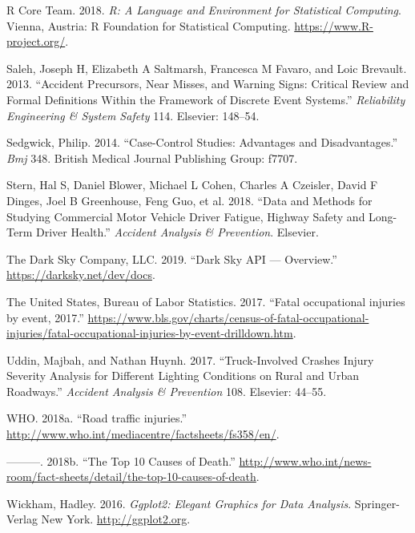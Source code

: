 \documentclass[]{elsarticle} %
\begin{document}
\leavevmode\hypertarget{ref-Rcitation}{}%
R Core Team. 2018. \emph{R: A Language and Environment for Statistical Computing}. Vienna, Austria: R Foundation for Statistical Computing. \url{https://www.R-project.org/}.

\leavevmode\hypertarget{ref-saleh2013accident}{}%
Saleh, Joseph H, Elizabeth A Saltmarsh, Francesca M Favaro, and Loic Brevault. 2013. ``Accident Precursors, Near Misses, and Warning Signs: Critical Review and Formal Definitions Within the Framework of Discrete Event Systems.'' \emph{Reliability Engineering \& System Safety} 114. Elsevier: 148--54.

\leavevmode\hypertarget{ref-sedgwick2014case}{}%
Sedgwick, Philip. 2014. ``Case-Control Studies: Advantages and Disadvantages.'' \emph{Bmj} 348. British Medical Journal Publishing Group: f7707.

\leavevmode\hypertarget{ref-stern2018data}{}%
Stern, Hal S, Daniel Blower, Michael L Cohen, Charles A Czeisler, David F Dinges, Joel B Greenhouse, Feng Guo, et al. 2018. ``Data and Methods for Studying Commercial Motor Vehicle Driver Fatigue, Highway Safety and Long-Term Driver Health.'' \emph{Accident Analysis \& Prevention}. Elsevier.

\leavevmode\hypertarget{ref-darksky}{}%
The Dark Sky Company, LLC. 2019. ``Dark Sky API --- Overview.'' \url{https://darksky.net/dev/docs}.

\leavevmode\hypertarget{ref-bols}{}%
The United States, Bureau of Labor Statistics. 2017. ``Fatal occupational injuries by event, 2017.'' \url{https://www.bls.gov/charts/census-of-fatal-occupational-injuries/fatal-occupational-injuries-by-event-drilldown.htm}.

\leavevmode\hypertarget{ref-uddin2017truck}{}%
Uddin, Majbah, and Nathan Huynh. 2017. ``Truck-Involved Crashes Injury Severity Analysis for Different Lighting Conditions on Rural and Urban Roadways.'' \emph{Accident Analysis \& Prevention} 108. Elsevier: 44--55.

\leavevmode\hypertarget{ref-who2018b}{}%
WHO. 2018a. ``Road traffic injuries.'' \url{http://www.who.int/mediacentre/factsheets/fs358/en/}.

\leavevmode\hypertarget{ref-who2018}{}%
---------. 2018b. ``The Top 10 Causes of Death.'' \url{http://www.who.int/news-room/fact-sheets/detail/the-top-10-causes-of-death}.

\leavevmode\hypertarget{ref-Rggplot2}{}%
Wickham, Hadley. 2016. \emph{Ggplot2: Elegant Graphics for Data Analysis}. Springer-Verlag New York. \url{http://ggplot2.org}.
\end{document}
